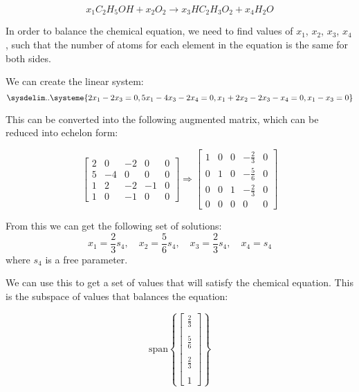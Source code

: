 \documentclass[12pt]{article}
\begin{document}
$$x_1C_2H_5OH + x_2O_2 \rightarrow x_3HC_2H_3O_2 + x_4H_2O$$

\begin{solution}
In order to balance the chemical equation, we need to find values of $x_1$, $x_2$, $x_3$, $x_4$, such that the number of atoms for each element in the equation is the same for both sides.

We can create the linear system:
$$\sysdelim..\systeme{
  2x_1 -          2x_3                   = 0,
  5x_1 -          4x_3           -2x_4   = 0,
   x_1 +   2x_2  -2x_3            -x_4   = 0,
   x_1 -           x_3                   = 0
}$$

This can be converted into the following augmented matrix, which can be reduced into echelon form:

$$\begin{bmatrix} 2 & 0 & -2 & 0 & 0 \\
				   5 & -4 & 0 & 0 & 0 \\
				   1 & 2 & -2 & -1 & 0 \\
				   1 & 0 & -1 & 0 & 0 \end{bmatrix} \Rightarrow 
\begin{bmatrix}  1 & 0 & 0 & -\frac{2}{3} & 0 \\
				  0 & 1 & 0 & -\frac{5}{6} & 0 \\
				  0  & 0 & 1 & -\frac{2}{3} & 0 \\
				   0 & 0 & 0 & 0 & 0 \end{bmatrix} $$
				 
From this we can get the following set of solutions:
$$ x_1 = \frac{2}{3}s_4, \quad x_2 = \frac{5}{6}s_4, \quad x_3 = \frac{2}{3}s_4,\quad  x_4 = s_4$$ where $s_4$ is a free parameter.

We can use this to get a set of values that will satisfy the chemical equation. This is the subspace of values that balances the equation:

$$\text{span}\left\lbrace \begin{bmatrix} \frac{2}{3} \\ \\ \frac{5}{6} \\ \\ \frac{2}{3} \\ \\ 1 \end{bmatrix} \right\rbrace $$



\end{solution}
\end{document}
